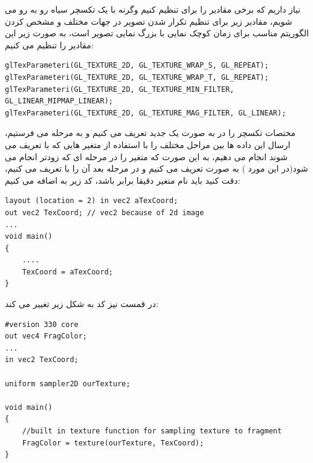 \documentclass[a4paper, 12pt]{book}
\newcommand{\lrit}[1]{\lr{\textit{#1}}}
\begin{document}
    نیاز داریم که برخی مقادیر را برای  تنظیم کنیم وگرنه با یک تکسچر سیاه رو به رو می شویم، مقادیر زیر برای تنظیم تکرار شدن تصویر در جهات مختلف و مشخص کردن الگوریتم مناسب برای زمان کوچک نمایی با بزرگ نمایی تصویر است، به صورت زیر این مقادیر را تنظیم می کنیم:

    \begin{LTR}
    \small
        \begin{lstlisting}[style=C++Style,caption=\lrit{set minimum setting for a texture}]
glTexParameteri(GL_TEXTURE_2D, GL_TEXTURE_WRAP_S, GL_REPEAT);	
glTexParameteri(GL_TEXTURE_2D, GL_TEXTURE_WRAP_T, GL_REPEAT);
glTexParameteri(GL_TEXTURE_2D, GL_TEXTURE_MIN_FILTER, GL_LINEAR_MIPMAP_LINEAR);
glTexParameteri(GL_TEXTURE_2D, GL_TEXTURE_MAG_FILTER, GL_LINEAR);
        \end{lstlisting}
    \end{LTR}
    \normalsize
    \vspace*{0.3cm}

    مختصات تکسچر را در  به صورت یک  جدید تعریف می کنیم و به مرحله  می فرستیم، ارسال این داده ها بین مراحل مختلف  را با استفاده از متغیر هایی که با  تعریف می شوند انجام می دهیم، به این صورت که متغیر را در مرحله ای که زودتر انجام می شود(در این مورد ) به صورت  تعریف می کنیم و در مرحله بعد آن را با  تعریف می کنیم، دقت کنید باید نام متغیر دقیقا برابر باشد، کد زیر به  اضافه می کنیم:

       \begin{LTR}
    \small
        \begin{lstlisting}[style=C++Style,caption=\lrit{vertex shader to use texture}]
layout (location = 2) in vec2 aTexCoord;
out vec2 TexCoord; // vec2 because of 2d image
...
void main()
{
    ....
    TexCoord = aTexCoord;
}
        \end{lstlisting}
    \end{LTR}
    \normalsize
    \vspace*{0.3cm}

    در قمست  نیز کد به شکل زیر تغییر می کند:

    \begin{LTR}
    \small
        \begin{lstlisting}[style=C++Style,caption=\lrit{fragment shader to use texture}]
#version 330 core
out vec4 FragColor;
...
in vec2 TexCoord;

uniform sampler2D ourTexture;

void main()
{
    //built in texture function for sampling texture to fragment
    FragColor = texture(ourTexture, TexCoord);
}
        \end{lstlisting}
    \end{LTR}
    \normalsize
    \vspace*{0.3cm}
\end{document}
